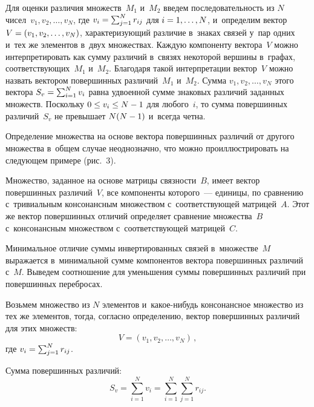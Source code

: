 \begin{multicols}{2}
     Для оценки различия множеств~$M_1$ и~$M_2$ введем 
последовательность из $N$ чисел~$v_1, v_2, \ldots, v_N$, где $v_i\hm= 
\sum\nolimits^N_{j=1} r_{ij}$ для $i \hm= 1, \ldots , N$, и~определим вектор 
$V\hm = (v_1, v_2, \ldots , v_N)$, ха\-рак\-те\-ри\-зу\-ющий различие в~знаках связей 
у~пар одних и~тех же элементов в~двух множествах. Каждую компоненту 
вектора~$V$ можно интерпретировать как сумму различий в~связях 
некоторой вершины в~графах, со\-от\-вет\-ст\-ву\-ющих~$M_1$ и~$M_2$. Благодаря 
такой интерпретации вектор~$V$ мож\-но назвать вектором повершинных 
раз\-ли\-чий~$M_1$ и~$M_2$. Сумма $v_1, v_2, \ldots , v_N$ этого вектора 
$S_v\hm= \sum\nolimits^N_{i=1} v_i$ равна удвоенной сумме знаковых 
раз\-ли\-чий заданных множеств.
     Поскольку $0 \hm\leq v_i \hm\leq N\hm-1$ для любого~$i$, то сумма 
повершинных различий~$S_v$ не превышает $N(N\hm-1)$ и~всегда \mbox{четна}.
     
     Определение множества на основе вектора повершинных различий от 
другого множества в~общем случае неоднозначно, что мож\-но 
про\-ил\-люст\-ри\-ро\-вать на сле\-ду\-ющем примере (рис.~3). 
     

     
     Множество, заданное на основе мат\-ри\-цы связ\-ности~$B$, имеет 
век\-тор повершинных различий~$V$, все компоненты которого~--- единицы, 
по срав\-не\-нию с~тривиальным консонансным множеством с~со\-от\-вет\-ст\-ву\-ющей 
мат\-ри\-цей~$A$. Этот же вектор повершинных отличий определяет срав\-не\-ние 
множества~$B$ с~консонансным множеством с~со\-от\-вет\-ст\-ву\-ющей 
мат\-ри\-цей~$C$.
     
     Минимальное отличие суммы инвертированных связей 
в~множестве~$M$ выражается в~минимальной сумме компонентов вектора 
повершинных различий с~$M$. Выведем соотношение для уменьшения 
суммы повершинных различий при повершинных перебросах. 
     
     Возьмем множество из $N$ элементов и~ка\-кое-ни\-будь консонансное 
множество из тех же элементов, тогда, согласно определению, вектор 
повершинных различий для этих множеств:
     $$
     V= \left(v_1, v_2, \ldots , v_N\right)\,, 
     $$
     где $v_i\hm= \sum\nolimits^N_{j=1} r_{ij}$.
     
Сумма повершинных различий:
     $$
     S_v= \sum\limits^N_{i=1} v_i= \sum\limits^N_{i=1} \sum\limits^N_{j=1} 
r_{ij}.
     $$
     

\end{multicols}
